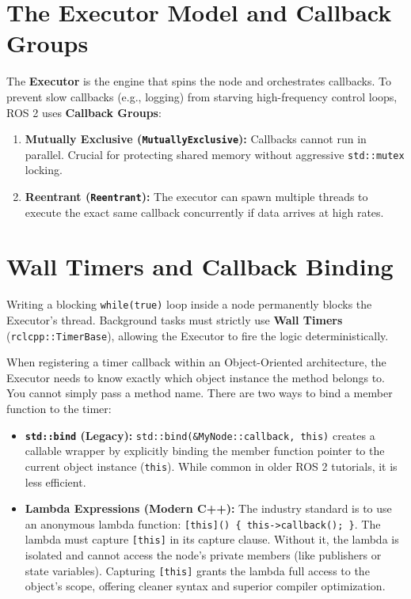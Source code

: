 \documentclass{article}
\begin{document}
\section{The Executor Model and Callback Groups}
The \textbf{Executor} is the engine that spins the node and orchestrates callbacks. To prevent slow callbacks (e.g., logging) from starving high-frequency control loops, ROS 2 uses \textbf{Callback Groups}:
\begin{enumerate}
    \item \textbf{Mutually Exclusive (\texttt{MutuallyExclusive}):} Callbacks cannot run in parallel. Crucial for protecting shared memory without aggressive \texttt{std::mutex} locking.
    \item \textbf{Reentrant (\texttt{Reentrant}):} The executor can spawn multiple threads to execute the exact same callback concurrently if data arrives at high rates.
\end{enumerate}

\section{Wall Timers and Callback Binding}
Writing a blocking \texttt{while(true)} loop inside a node permanently blocks the Executor's thread. Background tasks must strictly use \textbf{Wall Timers} (\texttt{rclcpp::TimerBase}), allowing the Executor to fire the logic deterministically.

When registering a timer callback within an Object-Oriented architecture, the Executor needs to know exactly which object instance the method belongs to. You cannot simply pass a method name. There are two ways to bind a member function to the timer:
\begin{itemize}
    \item \textbf{\texttt{std::bind} (Legacy):} \texttt{std::bind(\&MyNode::callback, this)} creates a callable wrapper by explicitly binding the member function pointer to the current object instance (\texttt{this}). While common in older ROS 2 tutorials, it is less efficient.
    \item \textbf{Lambda Expressions (Modern C++):} The industry standard is to use an anonymous lambda function: \texttt{[this]() \{ this->callback(); \}}. The lambda must capture \texttt{[this]} in its capture clause. Without it, the lambda is isolated and cannot access the node's private members (like publishers or state variables). Capturing \texttt{[this]} grants the lambda full access to the object's scope, offering cleaner syntax and superior compiler optimization.
\end{itemize}
\end{document}
